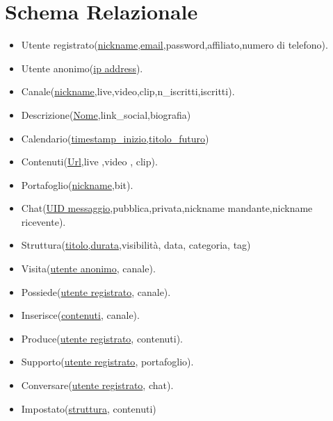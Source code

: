 \section{Schema Relazionale}
\begin{itemize}
    \item Utente registrato(\underline{nickname},\underline{email},password,affiliato,numero di telefono).
    \item Utente anonimo(\underline{ip address}).
    \item Canale(\underline{nickname},live,video,clip,n\_iscritti,iscritti).
    \item Descrizione(\underline{Nome},link\_social,biografia) 
    \item Calendario(\underline{timestamp\_inizio,titolo\_futuro})
    \item Contenuti(\underline{Url},live ,video , clip).
    \item Portafoglio(\underline{nickname},bit). 
    \item Chat(\underline{UID messaggio},pubblica,privata,nickname mandante,nickname ricevente). 
    \item Struttura(\underline{titolo,durata},visibilità, data, categoria, tag)
    \item Visita(\underline{utente anonimo}, canale).
    \item Possiede(\underline{utente registrato}, canale).
    \item Inserisce(\underline{contenuti}, canale).
    \item Produce(\underline{utente registrato}, contenuti).
    \item Supporto(\underline{utente registrato}, portafoglio).
    \item Conversare(\underline{utente registrato}, chat).
    \item Impostato(\underline{struttura}, contenuti)
\end{itemize}